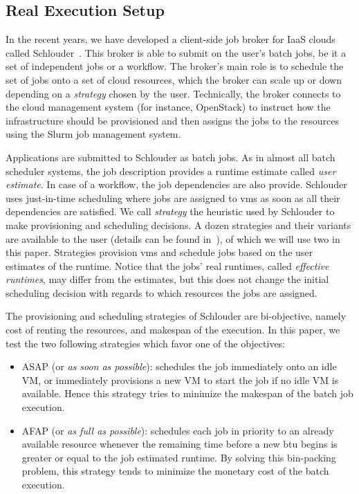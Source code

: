 \documentclass[10pt,conference,compsocconf]{IEEEtran}
\begin{document}
\subsection{Real Execution Setup}
In the recent years, we have developed  a client-side job broker for IaaS clouds
called Schlouder~\cite{Michon17}.  This broker is  able to submit on  the user's
batch jobs, be  it a set of  independent jobs or a workflow.   The broker's main
role is  to schedule the set  of jobs onto a  set of cloud resources,  which the
broker can scale up  or down depending on a \emph{strategy}  chosen by the user.
Technically, the broker  connects to the cloud management  system (for instance,
OpenStack) to  instruct how  the infrastructure should  be provisioned  and then
assigns the jobs to the resources using the Slurm job management system.

Applications are  submitted to Schlouder as  batch jobs. As in  almost all batch
scheduler  systems,  the job  description  provides  a runtime  estimate  called
\emph{user  estimate}. In  case of  a workflow,  the job  dependencies are  also
provide.   Schlouder uses  just-in-time scheduling  where jobs  are assigned  to
\acp{vm}  as   soon  as   all  their  dependencies   are  satisfied.    We  call
\emph{strategy}  the  heuristic  used  by Schlouder  to  make  provisioning  and
scheduling decisions.   A dozen strategies  and their variants are  available to
the user (details can be found in~\cite{GenaudG11}), of which we will use two in
this paper.  Strategies  provision \acp{vm} and schedule jobs based  on the user
estimates  of  the  runtime.   Notice  that  the  jobs'  real  runtimes,  called
\emph{effective  runtimes}, may  differ from  the estimates,  but this  does not
change the initial scheduling decision with  regards to which resources the jobs
are assigned.

The provisioning and scheduling strategies of Schlouder are bi-objective, namely
cost of renting the resources, and makespan of the execution.  In this paper, we
test the two following strategies which favor one of the objectives:
\begin{itemize}
\item ASAP (or \textit{as soon as possible}): schedules the job immediately onto
  an idle VM, or immediately provisions a new  VM to start the job if no idle VM
  is available.  Hence this strategy tries to minimize the makespan of the batch
  job execution.

\item AFAP (or \textit{as full as  possible}): schedules each job in priority to
	an already available resource whenever the remaining time  before a new
	\ac{btu} begins is greater or equal to the job estimated runtime.
	By solving this bin-packing problem, this strategy tends to minimize the
	monetary cost of the batch execution.
\end{itemize}
\end{document}
